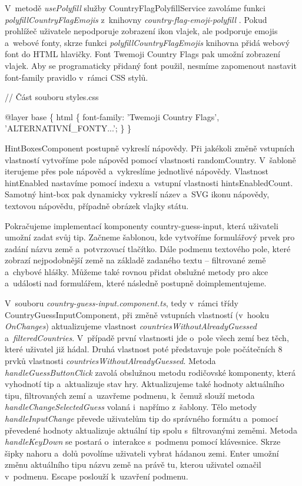 V~metodě \emph{usePolyfill} služby CountryFlagPolyfillService zavoláme funkci \emph{polyfillCountryFlagEmojis} z~knihovny \emph{country-flag-emoji-polyfill} \cite{countryflagemojipolyfill}. 
Pokud prohlížeč uživatele nepodporuje zobrazení ikon vlajek, ale podporuje emojis a~webové fonty, skrze funkci \emph{polyfillCountryFlagEmojis} knihovna přidá webový font do HTML hlavičky. 
Font Twemoji Country Flags pak umožní zobrazení vlajek. Aby se programaticky přidaný font použil, nesmíme zapomenout nastavit font-family pravidlo v~rámci CSS stylů.

\begin{prog}
// Část souboru styles.css

@layer base \{
  html \{
    font-family: 'Twemoji Country Flags', 'ALTERNATIVNÍ_FONTY...';
  \}
\}
\end{prog}

HintBoxesComponent postupně vykreslí nápovědy. Při jakékoli změně vstupních vlastností vytvoříme pole nápověd pomocí vlastnosti randomCountry. 
V~šabloně iterujeme přes pole nápověd a~vykreslíme jednotlivé nápovědy. Vlastnost hintEnabled nastavíme pomocí indexu a~vstupní vlastnosti hintsEnabledCount. 
Samotný hint-box pak dynamicky vykreslí název a~SVG ikonu nápovědy, textovou nápovědu, případně obrázek vlajky státu.

Pokračujeme implementací komponenty country-guess-input, která uživateli umožní zadat svůj tip. 
Začneme šablonou, kde vytvoříme formulářový prvek pro zadání názvu země a~potvrzovací tlačítko. 
Dále podmenu textového pole, které zobrazí nejpodobnější země na základě zadaného textu -- filtrované země a~chybové hlášky. 
Můžeme také rovnou přidat obslužné metody pro akce a~události nad formulářem, které následně postupně doimplementujeme.

V~souboru \emph{country-guess-input.component.ts}, tedy v~rámci třídy CountryGuessInputComponent, při změně vstupních vlastností (v~hooku \emph{OnChanges}) aktualizujeme vlastnost \emph{countriesWithoutAlreadyGuessed} a~\emph{filteredCountries}. 
V~případě první vlastnosti jde o~pole všech zemí bez těch, které uživatel již hádal. Druhá vlastnost poté představuje pole počátečních 8 prvků vlastnosti \emph{countriesWithoutAlreadyGuessed}. 
Metoda \emph{handleGuessButtonClick} zavolá obslužnou metodu rodičovské komponenty, která vyhodnotí tip a~aktualizuje stav hry. 
Aktualizujeme také hodnoty aktuálního tipu, filtrovaných zemí a~uzavřeme podmenu, k~čemuž slouží metoda \emph{handleChangeSelectedGuess} volaná i~napřímo z~šablony. 
Tělo metody \emph{handleInputChange} převede uživatelům tip do správného formátu a~pomocí převedené hodnoty aktualizuje aktuální tip spolu s~filtrovanými zeměmi.
Metoda \emph{handleKeyDown} se postará o~interakce s~podmenu pomocí klávesnice. Skrze šipky nahoru a~dolů povolíme uživateli vybrat hádanou zemi. 
Enter umožní změnu aktuálního tipu názvu země na právě tu, kterou uživatel označil v~podmenu. Escape poslouží k~uzavření podmenu.

